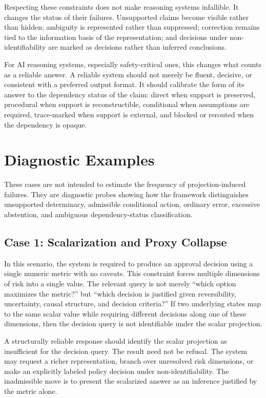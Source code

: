 \documentclass[11pt]{article}
\begin{document}
Respecting these constraints does not make reasoning systems infallible. It changes the status of their failures. Unsupported claims become visible rather than hidden; ambiguity is represented rather than suppressed; correction remains tied to the information basis of the representation; and decisions under non-identifiability are marked as decisions rather than inferred conclusions.

For AI reasoning systems, especially safety-critical ones, this changes what counts as a reliable answer. A reliable system should not merely be fluent, decisive, or consistent with a preferred output format. It should calibrate the form of its answer to the dependency status of the claim: direct when support is preserved, procedural when support is reconstructible, conditional when assumptions are required, trace-marked when support is external, and blocked or rerouted when the dependency is opaque.

\section{Diagnostic Examples}

These cases are not intended to estimate the frequency of projection-induced failures. They are diagnostic probes showing how the framework distinguishes unsupported determinacy, admissible conditional action, ordinary error, excessive abstention, and ambiguous dependency-status classification.

\subsection{Case 1: Scalarization and Proxy Collapse}

In this scenario, the system is required to produce an approval decision using a single numeric metric with no caveats. This constraint forces multiple dimensions of risk into a single value. The relevant query is not merely ``which option maximizes the metric?'' but ``which decision is justified given reversibility, uncertainty, causal structure, and decision criteria?'' If two underlying states map to the same scalar value while requiring different decisions along one of these dimensions, then the decision query is not identifiable under the scalar projection.

A structurally reliable response should identify the scalar projection as insufficient for the decision query. The result need not be refusal. The system may request a richer representation, branch over unresolved risk dimensions, or make an explicitly labeled policy decision under non-identifiability. The inadmissible move is to present the scalarized answer as an inference justified by the metric alone.
\end{document}
